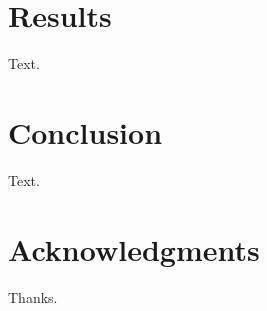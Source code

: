 \section{Results}
Text.

\section{Conclusion}
Text.

\section*{Acknowledgments}
Thanks. 



\renewcommand{\thechapter}{\Roman{chapter}}